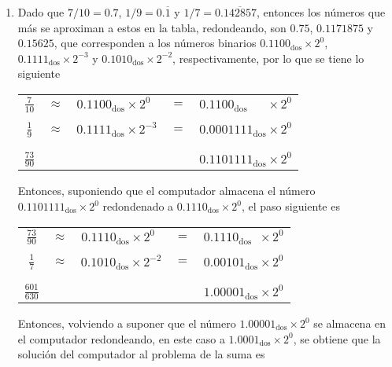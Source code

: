 \begin{solucion}
\begin{enumerate}
  \item Dado que $7/10 = 0.7$, $1/9 = 0.\overline{1}$ y $1/7 = 0.\overline{142857}$, entonces los n\'umeros que m\'as se aproximan a estos en la tabla, redondeando, son $0.75$, $0.1171875$ y $0.15625$, que corresponden a los n\'umeros binarios $0.1100_{\text{dos}}\times 2^{0}$, $0.1111_{\text{dos}}\times 2^{-3}$ y $0.1010_{\text{dos}}\times 2^{-2}$, respectivamente, por lo que se tiene lo siguiente
  \begin{center}
   \begin{tabular}{ccccc}
    $\frac{7}{10}$ & $\approx$ & $0.1100_{\text{dos}} \times 2^{0}\phantom{0}$ & $=$ & $0.1100_{\text{dos}}\phantom{011} \times 2^{0}$ \\ 
    \vspace{-0.3cm} 
    \\
    $\frac{1}{9}$ & $\approx$ & $0.1111_{\text{dos}} \times 2^{-3}$ & $=$ & $0.0001111_{\text{dos}} \times 2^{0}$ \\
    \vspace{-0.4cm}
    \\
    \hhline{-~~~-}
    \vspace{-0.4cm}
    \\
    $\frac{73}{90}$ & & & & $0.1101111_{\text{dos}} \times 2^{0}$
   \end{tabular}
  \end{center}
  Entonces, suponiendo que el computador almacena el n\'umero $0.1101111_{\text{dos}}\times 2^{0}$ redondenado a $0.1110_{\text{dos}} \times 2^{0}$, el paso siguiente es
  \begin{center}
   \begin{tabular}{ccccc}
    $\frac{73}{90}$ & $\approx$ & $0.1110_{\text{dos}}\times 2^{0}\phantom{1}$ & $=$ & $0.1110_{\text{dos}}\phantom{0} \times 2^{0}$ \\ 
    \vspace{-0.3cm} 
    \\
    $\frac{1}{7}$ & $\approx$ & $0.1010_{\text{dos}} \times 2^{-2}$ & $=$ & $0.00101_{\text{dos}} \times 2^{0}$ \\
    \vspace{-0.4cm}
    \\
    \hhline{-~~~-}
    \vspace{-0.4cm}
    \\
    $\frac{601}{630}$ & & & & $1.00001_{\text{dos}} \times 2^{0}$
   \end{tabular}
  \end{center}
  Entonces, volviendo a suponer que el n\'umero $1.00001_{\text{dos}} \times 2^{0}$ se almacena en el computador redondeando, en este caso a $1.0001_{\text{dos}} \times 2^{0}$, se obtiene que la soluci\'on del computador al problema de la suma es

\end{enumerate}
\end{solucion}
